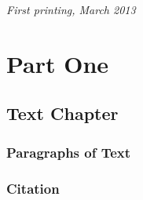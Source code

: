 \documentclass[11pt,fleqn]{book} %
\begin{document}
\noindent \textit{First printing, March 2013} %




\pagestyle{empty} %

\tableofcontents %

\cleardoublepage %

\pagestyle{fancy} %


\part{Part One}



\chapter{Text Chapter}

\section{Paragraphs of Text}

\lipsum[1-7] %


\section{Citation}
\end{document}
